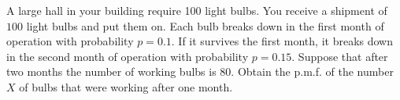 \documentclass[letterpaper,12pt,addpoints]{exam}
\begin{document}
\begin{questions}
\vspace*{\fill}
\eject


\question[10]
A large hall in your building require 100 light bulbs. You receive a shipment 
of $100$ light bulbs and put them on. Each bulb breaks down in the first month 
of operation with probability $p=0.1$. If it survives the first month, it 
breaks down in the second month of operation with probability $p=0.15$. Suppose 
that after two months the number of working bulbs is 80. Obtain the p.m.f. of 
the number $X$ of bulbs that were working after one month.



\end{questions}
\end{document}
